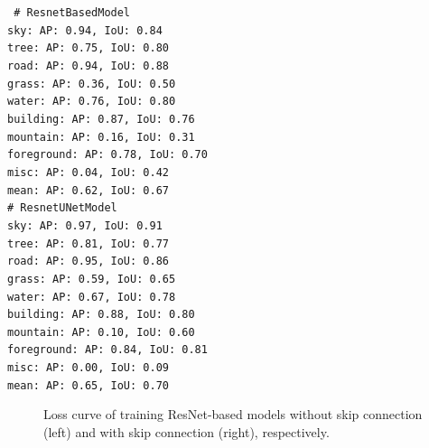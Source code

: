 \documentclass[11pt]{article}
\begin{document}
{\centering \tt \small
\# ResnetBasedModel \\
sky: AP: 0.94, IoU: 0.84 \\
tree: AP: 0.75, IoU: 0.80 \\
road: AP: 0.94, IoU: 0.88 \\
grass: AP: 0.36, IoU: 0.50 \\
water: AP: 0.76, IoU: 0.80 \\
building: AP: 0.87, IoU: 0.76 \\
mountain: AP: 0.16, IoU: 0.31 \\
foreground: AP: 0.78, IoU: 0.70 \\
misc: AP: 0.04, IoU: 0.42 \\
mean: AP: 0.62, IoU: 0.67 \\

\# ResnetUNetModel \\
sky: AP: 0.97, IoU: 0.91 \\
tree: AP: 0.81, IoU: 0.77 \\
road: AP: 0.95, IoU: 0.86 \\
grass: AP: 0.59, IoU: 0.65 \\
water: AP: 0.67, IoU: 0.78 \\
building: AP: 0.88, IoU: 0.80 \\
mountain: AP: 0.10, IoU: 0.60 \\
foreground: AP: 0.84, IoU: 0.81 \\
misc: AP: 0.00, IoU: 0.09 \\
mean: AP: 0.65, IoU: 0.70 \\
}

\begin{figure}[h]
    \centering
    \qquad
    \caption{Loss curve of training ResNet-based models without skip connection (left) and with skip connection (right), respectively.}
    \label{fig:loss-ResnetBasedModel]}
\end{figure}
\end{document}

